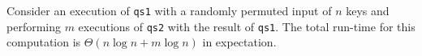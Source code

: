 \begin{abstrsyn}
\begin{theorem}
  Consider an execution of \texttt{qs1} with a randomly permuted input
  of $n$ keys and performing $m$ executions of \texttt{qs2} with the
  result of \texttt{qs1}.  The total run-time for this computation is
  $\Theta(n\log{n} + m\log{n})$ in expectation.
\end{theorem}


\begin{comment}

An astute programmer, having noticed that \texttt{quickselect} can be staged in
this fashion, might try to split it into a pair of functions, one which performs
all the work depending only on \texttt{l} (the first stage), and one which uses
that partial result and \texttt{k} to compute the element with
rank \texttt{k} in \texttt{l}. 

Intuitively, \texttt{l} determines the result of all calls to
\texttt{part}ition, and \texttt{k} only determines which calls are made. So we
can preprocess \texttt{l} by recursively dividing it into halves smaller and
greater than the pivot---that is, building a binary search tree. Then, once we
have \texttt{k}, we can recur on this tree, choosing whichever branch has the
\texttt{k}${}^\textit{th}$ leftmost element until we reach a leaf. And because
\texttt{part}ition contains no second-stage code, we can run it entirely in the
first stage.

We have implemented this splitting of quickselect in \ref{fig:qs-split}.
\texttt{qSelect1} builds a binary search tree from the list \texttt{l}, and
\texttt{qSelect2} takes such a tree and a rank \texttt{k} and computes the
answer. This allows us to efficiently perform many order statistics queries on
\texttt{l} by caching the tree and reusing it for many different ranks
$\mathtt{k_1},\dots,\mathtt{k_m}$:
%
\begin{lstlisting}
let b = qSelect1 l in
  qSelect2 b @$k_1$@
  qSelect2 b @$k_2$@
   @$\vdots$@ 
  qSelect2 b @$k_m$@.
\end{lstlisting}

Assuming \texttt{l} contains $n$ elements, this optimization changes the
asymptotic complexity from expected (randomized) $\Theta(n \cdot m)$ to
$\Theta(n\log{n} + m\log{n})$, which for any $m \approx n$ reduces the
complexity from $\Theta (n^2)$ to $\Theta(n\log{n})$---a significant improvement. 

In this paper, we develop a splitting algorithm
(\ref{sec:splitting,sec:implementation}) which, given a program $e$ in \lang,
produces an equivalent pair of programs which correspond precisely to the two
stages of computation in $e$.
(Splitting is always possible because the staging annotations in $e$ are
consistent, because $e$ is well-typed in \lang.) In the case of
\texttt{qsStaged}, our splitting algorithm produces the algorithm described
above.
\end{comment}


\end{abstrsyn}
